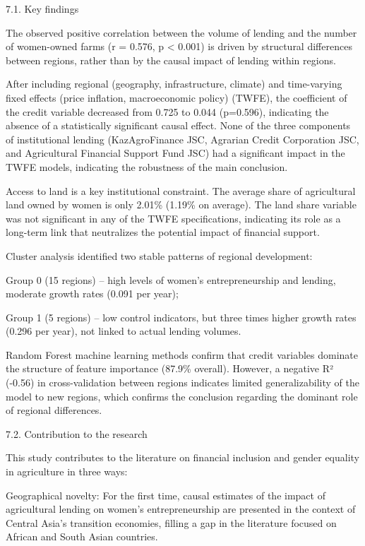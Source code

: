 7.1. Key findings

The observed positive correlation between the volume of lending and the
number of women-owned farms (r = 0.576, p \textless{} 0.001) is driven
by structural differences between regions, rather than by the causal
impact of lending within regions.

After including regional (geography, infrastructure, climate) and
time-varying fixed effects (price inflation, macroeconomic policy)
(TWFE), the coefficient of the credit variable decreased from 0.725 to
0.044 (p=0.596), indicating the absence of a statistically significant
causal effect. None of the three components of institutional lending
(KazAgroFinance JSC, Agrarian Credit Corporation JSC, and Agricultural
Financial Support Fund JSC) had a significant impact in the TWFE models,
indicating the robustness of the main conclusion.

Access to land is a key institutional constraint. The average share of
agricultural land owned by women is only 2.01\% (1.19\% on average). The
land share variable was not significant in any of the TWFE
specifications, indicating its role as a long-term link that neutralizes
the potential impact of financial support.

Cluster analysis identified two stable patterns of regional development:

Group 0 (15 regions) -- high levels of women's entrepreneurship and
lending, moderate growth rates (0.091 per year);

Group 1 (5 regions) -- low control indicators, but three times higher
growth rates (0.296 per year), not linked to actual lending volumes.

Random Forest machine learning methods confirm that credit variables
dominate the structure of feature importance (87.9\% overall). However,
a negative R² (-0.56) in cross-validation between regions indicates
limited generalizability of the model to new regions, which confirms the
conclusion regarding the dominant role of regional differences.

7.2. Contribution to the research

This study contributes to the literature on financial inclusion and
gender equality in agriculture in three ways:

Geographical novelty: For the first time, causal estimates of the impact
of agricultural lending on women's entrepreneurship are presented in the
context of Central Asia's transition economies, filling a gap in the
literature focused on African and South Asian countries.

